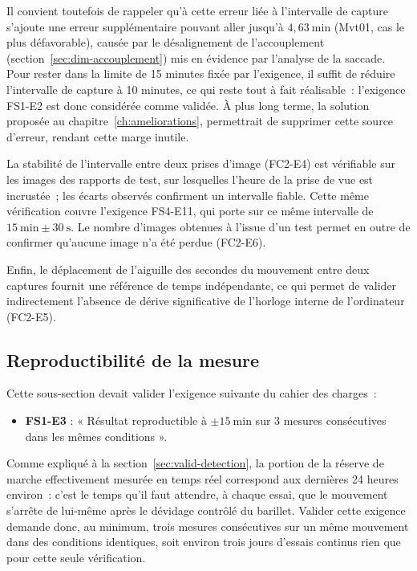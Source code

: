 Il convient toutefois de rappeler qu'à cette erreur liée à l'intervalle de
capture s'ajoute une erreur supplémentaire pouvant aller jusqu'à
$4{,}63\ \mathrm{min}$ (Mvt01, cas le plus défavorable), causée par le
désalignement de l'accouplement (section~\ref{sec:dim-accouplement}) mis en
évidence par l'analyse de la saccade. Pour
rester dans la limite de 15 minutes fixée par l'exigence, il suffit de
réduire l'intervalle de capture à 10 minutes, ce qui reste tout à fait
réalisable~: l'exigence FS1-E2 est donc considérée comme validée. À plus
long terme, la solution proposée au chapitre~\ref{ch:ameliorations}, permettrait de
supprimer cette source d'erreur, rendant cette marge inutile.

La stabilité de l'intervalle entre deux prises d'image (FC2-E4) est vérifiable
sur les images des rapports de test, sur lesquelles l'heure de la prise de vue
est incrustée~; les écarts observés confirment un intervalle fiable. Cette
même vérification couvre l'exigence FS4-E11, qui porte sur ce même intervalle
de $15\ \mathrm{min} \pm 30\ \mathrm{s}$. Le nombre d'images obtenues à l'issue
d'un test permet en outre de confirmer qu'aucune image n'a été perdue (FC2-E6).

Enfin, le déplacement de l'aiguille des secondes du mouvement entre deux
captures fournit une référence de temps indépendante, ce qui permet de
valider indirectement l'absence de dérive significative de l'horloge interne
de l'ordinateur (FC2-E5).

\subsection{Reproductibilité de la mesure}

Cette sous-section devait valider l'exigence suivante du cahier des charges~:
\begin{itemize}
    \item \textbf{FS1-E3} : « Résultat reproductible à $\pm 15\ \mathrm{min}$
          sur 3 mesures consécutives dans les mêmes conditions ».
\end{itemize}

Comme expliqué à la section~\ref{sec:valid-detection}, la portion de la
réserve de marche effectivement mesurée en temps réel correspond aux
dernières 24 heures environ~: c'est le temps qu'il faut attendre, à chaque
essai, que le mouvement s'arrête de lui-même après le dévidage contrôlé du
barillet. Valider cette exigence demande donc, au minimum, trois mesures
consécutives sur un même mouvement dans des conditions identiques, soit
environ trois jours d'essais continus rien que pour cette seule vérification.

